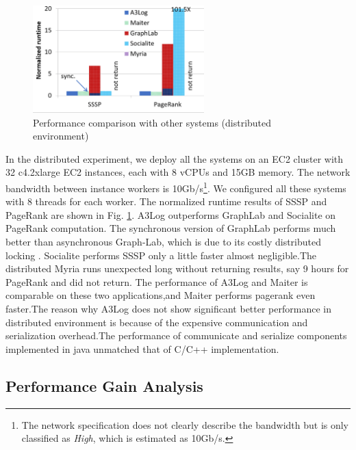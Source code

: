 \begin{figure}[!t]
	\vspace{0.0in}
	\centering
	\includegraphics[width=2.6in]{fig/dist-result}
	\vspace{-0.1in}
	\caption{Performance comparison with other systems (distributed environment)}
	\label{fig:dist-result}
	\vspace{-0.2in}
\end{figure}

In the distributed experiment, we deploy all the systems on an EC2 cluster with 32 c4.2xlarge EC2 instances, each with 8 vCPUs and 15GB memory. The network bandwidth between instance workers is 10Gb/s\footnote{The network specification does not clearly describe the bandwidth but is only classified as \emph{High}, which is estimated as 10Gb/s.}. We configured all these systems with 8 threads for each worker. The normalized runtime results of SSSP and PageRank are shown in Fig. \ref{fig:dist-result}. A3Log outperforms GraphLab and Socialite on PageRank computation. The synchronous version of GraphLab performs much better than asynchronous Graph-Lab, which is due to its costly distributed locking \cite{Han:2015:GUB:2777598.2777604,Low:2012:DGF:2212351.2212354}. Socialite performs SSSP only a little faster almost negligible.The distributed Myria runs unexpected long without returning results, say 9 hours for PageRank and did not return. The performance of A3Log and Maiter is comparable on these two applications,and Maiter performs pagerank even faster.The reason why A3Log does not show significant better performance in distributed environment is because of the expensive communication and serialization overhead.The performance of communicate and serialize components implemented in java unmatched that of C/C++ implementation. 
\subsection{Performance Gain Analysis}
\label{sec:expr:optimizations}

